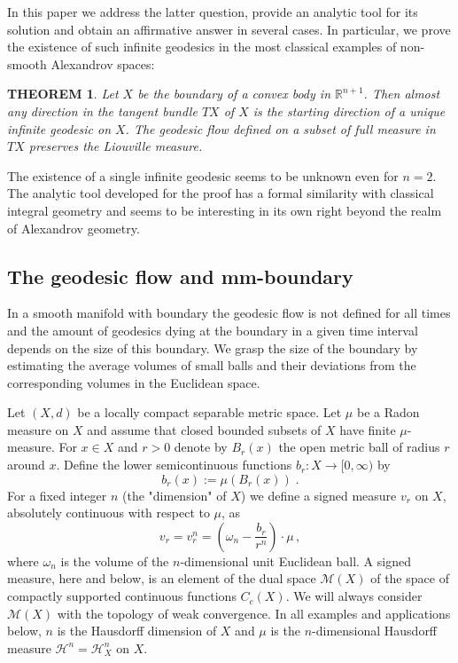 \documentclass[12pt,leqno]{amsart}
\numberwithin{equation}{section}
\newtheorem{thm}{THEOREM}[section]
\theoremstyle{definition}
\theoremstyle{remark}
\begin{document}
In this paper we address the latter question, provide an analytic tool for its solution and obtain  an affirmative answer  in several cases.  In particular, we
prove the existence of such  infinite geodesics in the most classical examples of non-smooth Alexandrov spaces:

\begin{thm} \label{thmfirst}
 Let $X$ be the boundary of a convex body in $\mathbb R^{n+1}$.
 Then almost any direction in the tangent bundle $TX$ of $X$
 is the starting direction of a unique  infinite geodesic on $X$.
 The geodesic flow defined on a subset  of full  measure in $TX$    preserves the Liouville measure.
 \end{thm}


The existence of a single infinite geodesic seems to be unknown even for $n=2$.
The analytic tool developed for the proof has a formal similarity with  classical integral geometry and seems to be interesting in its own right beyond the realm of Alexandrov geometry.

 \subsection{The geodesic flow and mm-boundary}
In a smooth manifold with boundary the geodesic flow is not defined for all times and the amount
of geodesics dying at the boundary in a given time interval depends on the size  of this boundary.   We grasp the size of the boundary by  estimating the
average volumes of small balls
and their deviations from the corresponding  volumes in the Euclidean space.

Let $(X,d)$ be a locally compact separable metric space. Let $\mu$ be   a  Radon  measure on $X$ and assume that closed bounded subsets
of $X$ have finite $\mu$-measure.
For $x\in X$ and $r>0$
denote by $B_r (x)$ the open metric ball of radius $r$ around  $x$. Define the lower semicontinuous functions $b_r:X\to [0,\infty )$ by
\begin{equation}
 b_r(x):=\mu (B_r (x)) \; .
 \end{equation}
For a fixed integer $n$ (the "dimension" of $X$)
 we define a signed measure $v_r$ on $X$, absolutely continuous with respect to $\mu$,   as
\begin{equation} \label{eq:first}
 v_r=v^n_r = (\omega _n - \frac {b_r} {r^n} )\cdot \mu \, ,
\end{equation}
where $\omega _n$ is the volume of the $n$-dimensional unit
 Euclidean ball.  A signed measure, here and below, is an element of the dual space $\mathcal M(X)$ of the space of compactly supported continuous functions $C_c (X)$.
We will always consider $\mathcal M(X)$ with the topology of weak convergence.
In all examples and applications below,  $n$  is the Hausdorff dimension of $X$ and $\mu$ is the $n$-dimensional Hausdorff measure $\mathcal H^n =\mathcal H^n _X$ on $X$.
\end{document}
